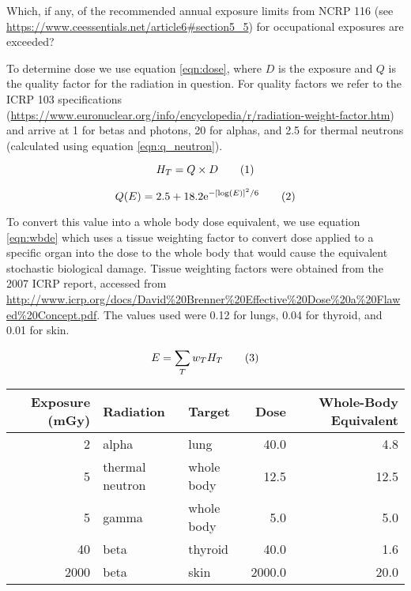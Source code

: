 \documentclass{hw}
\begin{document}
Which, if any, of the recommended annual exposure limits from NCRP 116 (see 
\url{https://www.ceessentials.net/article6#section5_5}) for occupational 
exposures are exceeded?

\solution
To determine dose we use equation \ref{eqn:dose}, where $D$ is the 
exposure and $Q$ is the quality factor for the radiation in question. For 
quality factors we refer to the ICRP 103 specifications 
(\url{https://www.euronuclear.org/info/encyclopedia/r/radiation-weight-factor.htm}) 
and arrive at 1 for betas and photons, 20 for alphas, and 2.5 for thermal 
neutrons (calculated using equation \ref{eqn:q_neutron}).

\begin{equation*}
    \label{eqn:dose}
    H_T = Q \times D \numberthis
\end{equation*}

\begin{equation*}
    \label{eqn:q_neutron}
    Q(E) = 2.5 + 18.2 \mathrm{e}^{-\left[ \log(E) \right]^2 / 6} \numberthis
\end{equation*}

To convert this value into a whole body dose equivalent, we use equation 
\ref{eqn:wbde} which uses a tissue weighting factor to convert dose applied to 
a specific organ into the dose to the whole body that would cause the 
equivalent stochastic biological damage. Tissue weighting factors were obtained 
from the 2007 ICRP report, accessed from 
\url{http://www.icrp.org/docs/David%20Brenner%20Effective%20Dose%20a%20Flawed%20Concept.pdf}. 
The values used were 0.12 for lungs, 0.04 for thyroid, and 0.01 for skin.

\begin{equation*}
    \label{eqn:wbde}
    E = \sum_T w_T H_T \numberthis
\end{equation*}

\begin{tabular}{rllrr}
\toprule
Exposure (mGy) &        Radiation &      Target &    Dose &  Whole-Body Equivalent \\
\midrule
             2 &            alpha &        lung &    40.0 &                    4.8 \\
             5 &  thermal neutron &  whole body &    12.5 &                   12.5 \\
             5 &            gamma &  whole body &     5.0 &                    5.0 \\
            40 &             beta &     thyroid &    40.0 &                    1.6 \\
          2000 &             beta &        skin &  2000.0 &                   20.0 \\
\bottomrule
\end{tabular}
\end{document}
